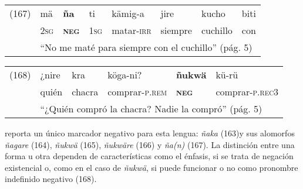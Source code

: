 {%
\begin{tabular}{llllllll}
(167) & mä & \textbf{ña} & ti & kämig-a & jire & kucho & biti \\
& \textsc{2sg} & \textsc{\textbf{neg}} & \textsc{1sg} & matar-\textsc{irr} & siempre & cuchillo & con \\
& \multicolumn{7}{l}{``No me maté para siempre con el cuchillo'' (pág. 5)}
\end{tabular} \vspace{0.5cm}

\begin{tabular}{llllll}
(168) & ¿nire & kra & köga-ni? & \textbf{ñukwä} & kü-rü \\
& quién & chacra & comprar-\textsc{p.rem} & \textsc{\textbf{neg}} & comprar-\textsc{p.rec3} \\
& \multicolumn{5}{l}{``¿Quién compró la chacra? Nadie la compró'' (pág. 5)}
\end{tabular} \vspace{0.5cm}

}

\textcolor{MidnightBlue}{\citet{ngabere}} reporta un único marcador negativo para esta lengua: {\setmainfont{Charis SIL} \textit{ñaka}} (163)y sus alomorfos {\setmainfont{Charis SIL} \textit{ñagare}} (164), {\setmainfont{Charis SIL} \textit{ñukwä}} (165), {\setmainfont{Charis SIL} \textit{ñukwäre}} (166) y {\setmainfont{Charis SIL} \textit{ña(n)}} (167). La distinción entre una forma u otra dependen de características como el énfasis, si se trata de negación existencial o, como en el caso de {\setmainfont{Charis SIL} \textit{ñukwä}}, si puede funcionar o no como pronombre indefinido negativo (168).